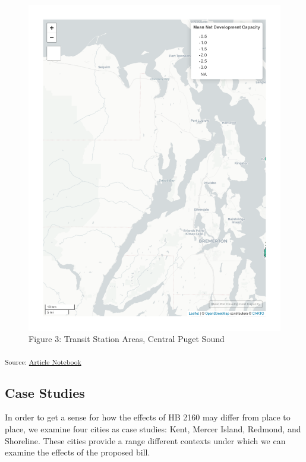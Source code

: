 \documentclass[
]{agujournal2019}
\begin{document}
\begin{figure}[H]

{\centering \includegraphics{index_files/figure-pdf/results-puget-sound-station-map-1.pdf}

}

\caption{Figure 3: Transit Station Areas, Central Puget Sound}

\end{figure}%

\textsubscript{Source:
\href{https://tiernanmartin.github.io/2024-transit-oriented-development-bill/index.qmd.html}{Article
Notebook}}

\subsection{Case Studies}\label{case-studies}

In order to get a sense for how the effects of HB 2160 may differ from
place to place, we examine four cities as case studies: Kent, Mercer
Island, Redmond, and Shoreline. These cities provide a range different
contexts under which we can examine the effects of the proposed bill.
\end{document}
